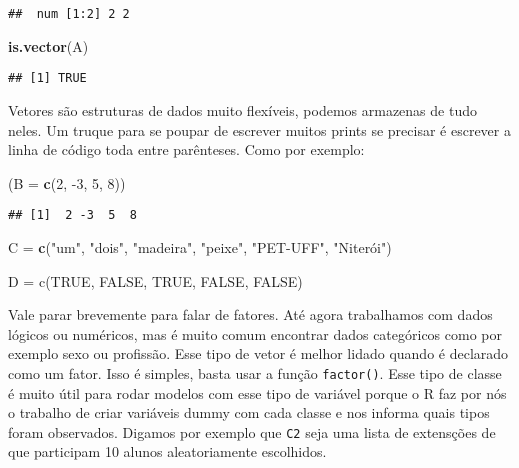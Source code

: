 \documentclass[]{article}
\newenvironment{Shaded}{\begin{snugshade}}{\end{snugshade}}
\newcommand{\DataTypeTok}[1]{\textcolor[rgb]{0.13,0.29,0.53}{#1}}
\newcommand{\DecValTok}[1]{\textcolor[rgb]{0.00,0.00,0.81}{#1}}
\newcommand{\KeywordTok}[1]{\textcolor[rgb]{0.13,0.29,0.53}{\textbf{#1}}}
\newcommand{\NormalTok}[1]{#1}
\newcommand{\StringTok}[1]{\textcolor[rgb]{0.31,0.60,0.02}{#1}}
\begin{document}
\begin{verbatim}
##  num [1:2] 2 2
\end{verbatim}

\begin{Shaded}
\begin{Highlighting}[]
\KeywordTok{is.vector}\NormalTok{(A)}
\end{Highlighting}
\end{Shaded}

\begin{verbatim}
## [1] TRUE
\end{verbatim}

Vetores são estruturas de dados muito flexíveis, podemos armazenas de
tudo neles. Um truque para se poupar de escrever muitos prints se
precisar é escrever a linha de código toda entre parênteses. Como por
exemplo:

\begin{Shaded}
\begin{Highlighting}[]
\NormalTok{(}\DataTypeTok{B =} \KeywordTok{c}\NormalTok{(}\DecValTok{2}\NormalTok{, }\DecValTok{-3}\NormalTok{, }\DecValTok{5}\NormalTok{, }\DecValTok{8}\NormalTok{))}
\end{Highlighting}
\end{Shaded}

\begin{verbatim}
## [1]  2 -3  5  8
\end{verbatim}

\begin{Shaded}
\begin{Highlighting}[]
\NormalTok{C =}\StringTok{ }\KeywordTok{c}\NormalTok{(}\StringTok{"um"}\NormalTok{, }\StringTok{"dois"}\NormalTok{, }\StringTok{"madeira"}\NormalTok{, }\StringTok{"peixe"}\NormalTok{, }\StringTok{"PET-UFF"}\NormalTok{, }\StringTok{"Niterói")}

\StringTok{D = c(TRUE, FALSE, TRUE, FALSE, FALSE)}
\end{Highlighting}
\end{Shaded}

Vale parar brevemente para falar de fatores. Até agora trabalhamos com
dados lógicos ou numéricos, mas é muito comum encontrar dados
categóricos como por exemplo sexo ou profissão. Esse tipo de vetor é
melhor lidado quando é declarado como um fator. Isso é simples, basta
usar a função \texttt{factor()}. Esse tipo de classe é muito útil para
rodar modelos com esse tipo de variável porque o R faz por nós o
trabalho de criar variáveis dummy com cada classe e nos informa quais
tipos foram observados. Digamos por exemplo que \texttt{C2} seja uma
lista de extensções de que participam 10 alunos aleatoriamente
escolhidos.
\end{document}
